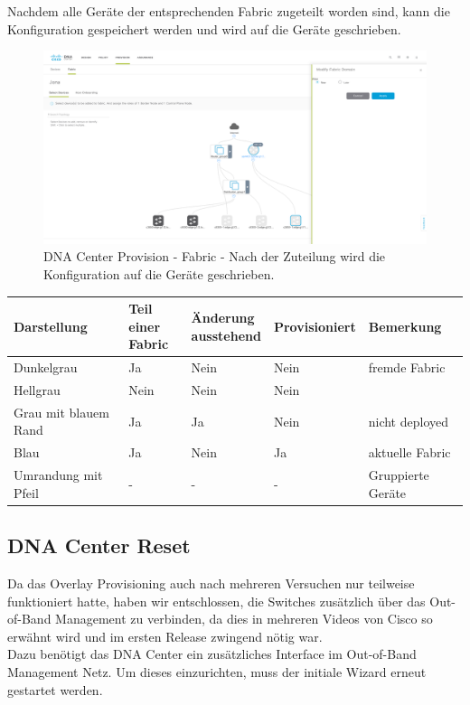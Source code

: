 Nachdem alle Geräte der entsprechenden Fabric zugeteilt worden sind, kann die Konfiguration gespeichert werden und wird auf die Geräte geschrieben. 

\begin{figure}[H]
	\centering
	\includegraphics[width=16cm]{img/dna-center-fabric-1.png}
	\caption{DNA Center Provision - Fabric - Nach der Zuteilung wird die Konfiguration auf die Geräte geschrieben.}
	\label{fig:IP Base and Services}
\end{figure}


\begin{tabular}{| l | l | l | l | l |}
	\hline
	\textbf{Darstellung} & \makecell{\textbf{Teil einer}\\ \textbf{Fabric}} & \makecell{\textbf{Änderung}\\ \textbf{ausstehend}} & \textbf{Provisioniert} & \textbf{Bemerkung} \\
	\hline
	Dunkelgrau & Ja & Nein & Nein & fremde Fabric \\
	Hellgrau & Nein & Nein & Nein &  \\
	Grau mit blauem Rand & Ja & Ja & Nein & nicht deployed\\
	Blau & Ja & Nein & Ja & aktuelle Fabric\\
	Umrandung mit Pfeil & - & - & - & Gruppierte Geräte\\	
	\hline
\end{tabular}

\subsection{DNA Center Reset}
Da das Overlay Provisioning auch nach mehreren Versuchen nur teilweise funktioniert hatte, haben wir entschlossen, die Switches zusätzlich über das Out-of-Band Management zu verbinden, da dies in mehreren Videos von Cisco so erwähnt wird und im ersten Release zwingend nötig war. \\
Dazu benötigt das DNA Center ein zusätzliches Interface im Out-of-Band Management Netz. Um dieses einzurichten, muss der initiale Wizard erneut gestartet werden. 

